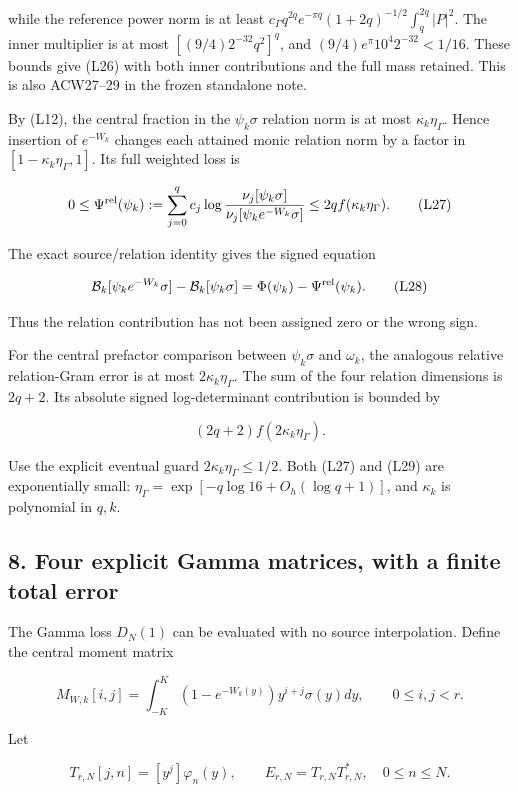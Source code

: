 \documentclass[11pt,a4paper]{article}
\begin{document}
while the reference power norm is at least
\(c_\Gamma q^{2q}e^{-\pi q}(1+2q)^{-1/2}\int_q^{2q}|P|^2\).
The inner multiplier is at most \([(9/4)2^{-32}q^2]^q\), and
\((9/4)e^\pi10^4 2^{-32}<1/16\). These bounds give (L26) with both inner contributions and the full mass retained. This is also ACW27--29 in the frozen standalone note.

By (L12), the central fraction in the \(\psi_k\sigma\) relation norm is at most \(\kappa_k\eta_\Gamma\). Hence insertion of \(e^{-W_k}\) changes each attained monic relation norm by a factor in
\([1-\kappa_k\eta_\Gamma,1]\). Its full weighted loss is

\[
0\le\Psi^{\rm rel}(\psi_k)
:=\sum_{j=0}^qc_j\log\frac{\nu_j[\psi_k\sigma]}
{\nu_j[\psi_ke^{-W_k}\sigma]}
\le2q f(\kappa_k\eta_\Gamma).
\tag{L27}
\]

The exact source/relation identity gives the signed equation

\[
\mathcal B_k[\psi_ke^{-W_k}\sigma]-\mathcal B_k[\psi_k\sigma]
=\Phi(\psi_k)-\Psi^{\rm rel}(\psi_k).
\tag{L28}
\]

Thus the relation contribution has not been assigned zero or the wrong sign.

For the central prefactor comparison between \(\psi_k\sigma\) and \(\omega_k\), the analogous relative relation-Gram error is at most \(2\kappa_k\eta_\Gamma\). The sum of the four relation dimensions is \(2q+2\). Its absolute signed log-determinant contribution is bounded by

\[
(2q+2)f(2\kappa_k\eta_\Gamma).
\tag{L29}
\]

Use the explicit eventual guard \(2\kappa_k\eta_\Gamma\le1/2\). Both (L27) and (L29) are exponentially small: \(\eta_\Gamma=\exp[-q\log16+O_h(\log q+1)]\), and \(\kappa_k\) is polynomial in \(q,k\).

\subsection{8. Four explicit Gamma matrices, with a finite total error}\label{loc:four-explicit-gamma-matrices-with-a-finite-total-error}

The Gamma loss \(D_N(1)\) can be evaluated with no source interpolation. Define the central moment matrix

\[
M_{W,k}[i,j]=\int_{-K}^{K}
(1-e^{-W_k(y)})y^{i+j}\sigma(y)dy,
\qquad0\le i,j<r.
\tag{L30}
\]

Let

\[
T_{r,N}[j,n]=[y^j]\varphi_n(y),\qquad
E_{r,N}=T_{r,N}T_{r,N}^*,\quad 0\le n\le N.
\tag{L31}
\]
\end{document}
